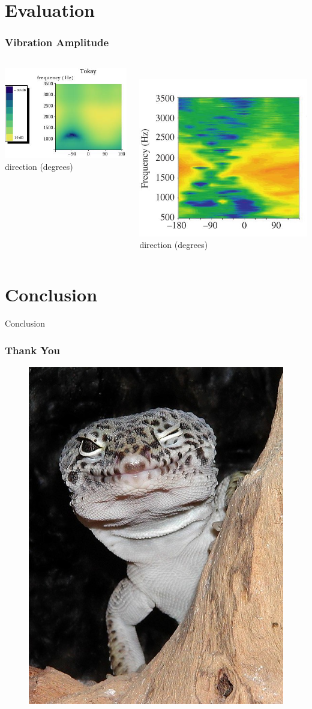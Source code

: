 \documentclass{beamer}
\let\oldfootnotesize\footnotesize
\renewcommand*{\footnotesize}{\oldfootnotesize\tiny}
\begin{document}
\section{Evaluation}
\begin{frame}
\frametitle{Vibration Amplitude}
\begin{columns}
    \begin{column}{0.5\textwidth}
      \centering
      \includegraphics[width = 5.6 cm]{Diagrams/Plots/tokayvibamp.jpeg}\\
     
      \footnotesize \hspace{4pt} direction (degrees)
    \end{column}

    \begin{column}{0.5\textwidth}
    \textbf{}\\
    \vspace{1pt}
    \flushright
      \includegraphics[width = 4.25 cm]{Diagrams/Plots/tokayvibamp_exp.jpeg}\\
      \centering
      \footnotesize direction (degrees)
    \end{column}
  \end{columns}
\end{frame}

\section{Conclusion}
\begin{frame}
 Conclusion
\end{frame}

\begin{frame}
 \frametitle{Thank You}
 \begin{figure}
  \centering
  \includegraphics[width=.3\textwidth]{Diagrams/geckowink.jpg}
 \end{figure}
\end{frame}
\end{document}
